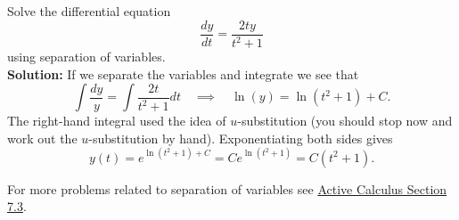 \begin{example}
   Solve the differential equation 
   \[ \frac{dy}{dt} = \frac{2ty}{t^2+1} \]
   using separation of variables. \\{\bf Solution:}
   If we separate the variables and integrate we see that 
   \[ \int \frac{dy}{y} = \int \frac{2t}{t^2+1} dt \quad \implies \quad \ln(y) =
   \ln(t^2+1)+C. \]
   The right-hand integral used the idea of $u$-substitution (you should stop now and work
   out the $u$-substitution by hand).  Exponentiating both sides gives
   \[ y(t) = e^{\ln(t^2+1)+C} = Ce^{\ln(t^2+1)} = C(t^2+1). \]
\end{example}

For more problems related to separation of variables see
\href{https://activecalculus.org/single/sec-7-4-separable.html}{Active Calculus Section
7.3}.  


% 
% 
% 
% 
% 

